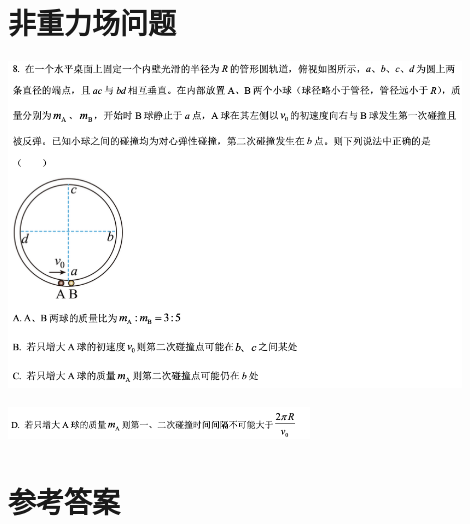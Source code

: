 \documentclass{article}
\begin{document}
\vspace{5em}

\section{非重力场问题}
\includegraphics[width = 0.9\textwidth]{./pictures/21-1.png}

\hspace{0.2em}\includegraphics[width = 0.6\textwidth]{./pictures/21-2.png}




\newpage

\section{参考答案}
\end{document}
